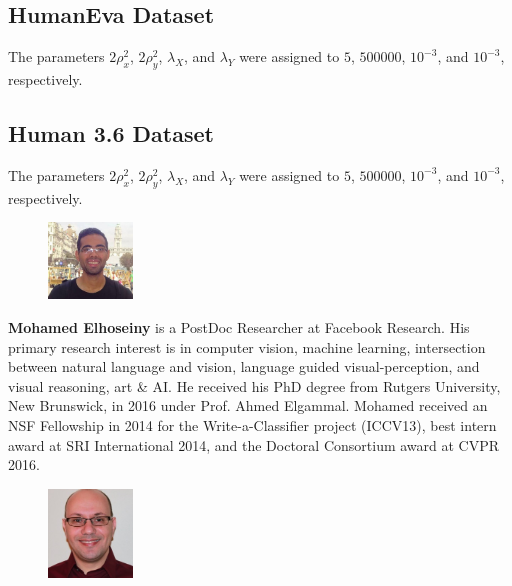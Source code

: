 \begin{appendices}
\subsection{HumanEva Dataset}

The parameters $2 \rho_x^2$, $2 \rho_y^2$, $\lambda_X$, and $\lambda_Y$ were assigned to  $5$, $500000$, $10^{-3}$, and $10^{-3}$, respectively. 


\subsection{Human 3.6 Dataset}

The parameters $2 \rho_x^2$, $2 \rho_y^2$, $\lambda_X$, and $\lambda_Y$ were assigned to  $5$, $500000$, $10^{-3}$, and $10^{-3}$, respectively.







\end{appendices}

\clearpage
\begin{figure}
     \includegraphics[width=0.2\textwidth]{elhoseiny.jpg}
\end{figure}
\textbf{Mohamed Elhoseiny } is a PostDoc Researcher at Facebook Research.
His primary research interest is in computer vision, machine learning, intersection between natural language and vision, language guided visual-perception,  and visual reasoning, art \& AI. He received his PhD degree from Rutgers University, New Brunswick, in 2016 under Prof. Ahmed Elgammal. Mohamed received an NSF Fellowship in 2014 for the Write-a-Classifier project (ICCV13), best intern award at SRI International 2014, and the Doctoral Consortium award at CVPR 2016.
\vspace{2mm}
 \begin{figure}  
\vspace{-5mm} 
         \includegraphics[width=0.2\textwidth]{elgammal.jpg}
         \vspace{-10mm} 
\end{figure}\,\,\;

